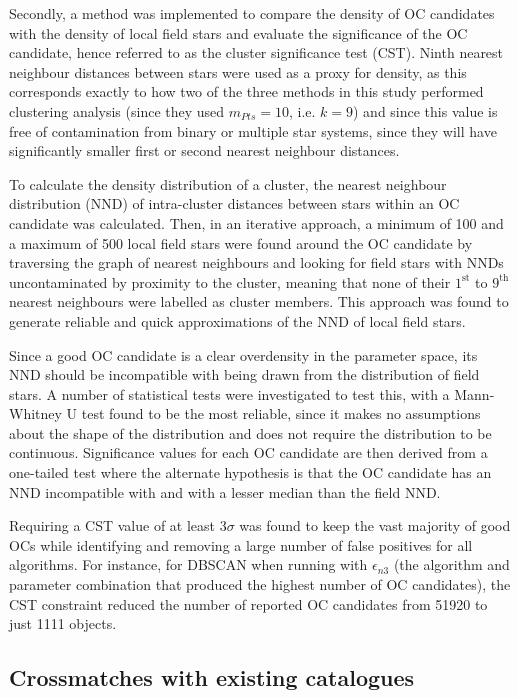Secondly, a method was implemented to compare the density of OC candidates with the density of local field stars and evaluate the significance of the OC candidate, hence referred to as the cluster significance test (CST). Ninth nearest neighbour distances between stars were used as a proxy for density, as this corresponds exactly to how two of the three methods in this study performed clustering analysis (since they used $m_{Pts}=10$, i.e. $k=9$) and since this value is free of contamination from binary or multiple star systems, since they will have significantly smaller first or second nearest neighbour distances.

To calculate the density distribution of a cluster, the nearest neighbour distribution (NND) of intra-cluster distances between stars within an OC candidate was calculated. Then, in an iterative approach, a minimum of 100 and a maximum of 500 local field stars were found around the OC candidate by traversing the graph of nearest neighbours and looking for field stars with NNDs uncontaminated by proximity to the cluster, meaning that none of their $1^\text{st}$ to $9^\text{th}$ nearest neighbours were labelled as cluster members. This approach was found to generate reliable and quick approximations of the NND of local field stars.

Since a good OC candidate is a clear overdensity in the parameter space, its NND should be incompatible with being drawn from the distribution of field stars. A number of statistical tests were investigated to test this, with a Mann-Whitney U test \citep{mann_test_1947} found to be the most reliable, since it makes no assumptions about the shape of the distribution and does not require the distribution to be continuous. Significance values for each OC candidate are then derived from a one-tailed test where the alternate hypothesis is that the OC candidate has an NND incompatible with and with a lesser median than the field NND.

Requiring a CST value of at least 3$\sigma$ was found to keep the vast majority of good OCs while identifying and removing a large number of false positives for all algorithms. For instance, for DBSCAN when running with $\epsilon_{n3}$ (the algorithm and parameter combination that produced the highest number of OC candidates), the CST constraint reduced the number of reported OC candidates from 51920 to just 1111 objects.


\subsection{Crossmatches with existing catalogues}\label{c2:sec:results_crossmatch}

